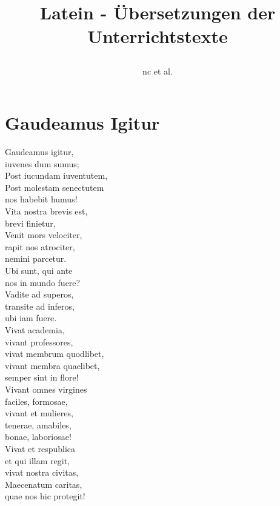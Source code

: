 \documentclass[a4paper]{article}
\begin{document}
\title{Latein - Übersetzungen der Unterrichtstexte \\
	\author{nc et al.}}
	\maketitle
\tableofcontents
\newpage
\section{Gaudeamus Igitur}
\begin{multicols}{2}
	Gaudeamus igitur, \\
	iuvenes dum sumus; \\
	Post iucundam iuventutem, \\
	Post molestam senectutem \\
	nos habebit humus! \\

	Vita nostra brevis est, \\
	brevi finietur, \\
	Venit mors velociter, \\
	rapit nos atrociter, \\
	nemini parcetur. \\

	Ubi sunt, qui ante \\
	nos in mundo fuere? \\
	Vadite ad superos, \\
	transite ad inferos, \\
	ubi iam fuere. \\

	Vivat academia, \\
	vivant professores, \\
	vivat membrum quodlibet, \\
	vivant membra quaelibet, \\
	semper sint in flore! \\

	Vivant omnes virgines \\
	faciles, formosae, \\
	vivant et mulieres, \\
	tenerae, amabiles, \\
	bonae, laboriosae! \\

	Vivat et respublica \\
	et qui illam regit, \\
	vivat nostra civitas, \\
	Maecenatum caritas, \\
	quae nos hic protegit! \\


\end{multicols}
\end{document}
